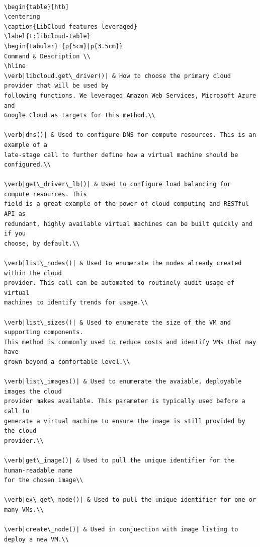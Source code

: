 \begin{verbatim} 

\begin{table}[htb]
\centering
\caption{LibCloud features leveraged}
\label{t:libcloud-table}
\begin{tabular} {p{5cm}|p{3.5cm}}
Command & Description \\
\hline
\verb|libcloud.get\_driver()| & How to choose the primary cloud provider that will be used by
following functions. We leveraged Amazon Web Services, Microsoft Azure and
Google Cloud as targets for this method.\\

\verb|dns()| & Used to configure DNS for compute resources. This is an example of a
late-stage call to further define how a virtual machine should be configured.\\

\verb|get\_driver\_lb()| & Used to configure load balancing for compute resources. This
field is a great example of the power of cloud computing and RESTful API as
redundant, highly available virtual machines can be built quickly and if you
choose, by default.\\

\verb|list\_nodes()| & Used to enumerate the nodes already created within the cloud
provider. This call can be automated to routinely audit usage of virtual
machines to identify trends for usage.\\

\verb|list\_sizes()| & Used to enumerate the size of the VM and supporting components.
This method is commonly used to reduce costs and identify VMs that may have
grown beyond a comfortable level.\\

\verb|list\_images()| & Used to enumerate the avaiable, deployable images the cloud
provider makes available. This parameter is typically used before a call to
generate a virtual machine to ensure the image is still provided by the cloud
provider.\\

\verb|get\_image()| & Used to pull the unique identifier for the human-readable name
for the chosen image\\

\verb|ex\_get\_node()| & Used to pull the unique identifier for one or many VMs.\\

\verb|create\_node()| & Used in conjuection with image listing to deploy a new VM.\\


\end{verbatim}
